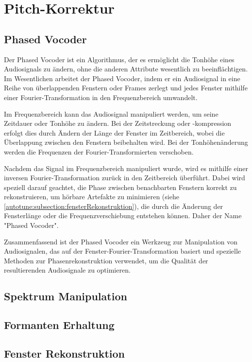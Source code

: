 %
%
%
%

\section{Pitch-Korrektur
\label{autotune:section:pitchKorrektur}}


\subsection{Phased Vocoder
\label{autotune:subsection:phasedVocoder}}
Der Phased Vocoder ist ein Algorithmus,
der es ermöglicht die Tonhöhe eines Audiosignals zu ändern, ohne die anderen Attribute wesentlich zu beeinflächtigen.
Im Wesentlichen arbeitet der Phased Vocoder,
indem er ein Audiosignal in eine Reihe von überlappenden Fenstern oder Frames zerlegt und jedes Fenster mithilfe einer Fourier-Transformation in den Frequenzbereich umwandelt.

Im Frequenzbereich kann das Audiosignal manipuliert werden, um seine Zeitdauer oder Tonhöhe zu ändern.
Bei der Zeitstreckung oder -kompression erfolgt dies durch Ändern der Länge der Fenster im Zeitbereich,
wobei die Überlappung zwischen den Fenstern beibehalten wird.
Bei der Tonhöhenänderung werden die Frequenzen der Fourier-Transformierten verschoben.

Nachdem das Signal im Frequenzbereich manipuliert wurde, wird es mithilfe einer inversen Fourier-Transformation zurück in den Zeitbereich überführt.
Dabei wird speziell darauf geachtet, die Phase zwischen benachbarten Fenstern korrekt zu rekonstruieren,
um hörbare Artefakte zu minimieren (siehe \ref{autotune:subsection:fensterRekonstruktion}),
die durch die Änderung der Fensterlänge oder die Frequenzverschiebung entstehen können.
Daher der Name "Phased Vocoder".


Zusammenfassend ist der Phased Vocoder ein Werkzeug zur Manipulation von Audiosignalen,
das auf der Fenster-Fourier-Transformation basiert und spezielle Methoden zur Phasenrekonstruktion verwendet,
um die Qualität der resultierenden Audiosignale zu optimieren.


\subsection{Spektrum Manipulation
\label{autotune:subsection:spektrumManipulation}}



\subsection{Formanten Erhaltung
\label{autotune:subsection:formantenErhaltung}}



\subsection{Fenster Rekonstruktion
\label{autotune:subsection:fensterRekonstruktion}}

